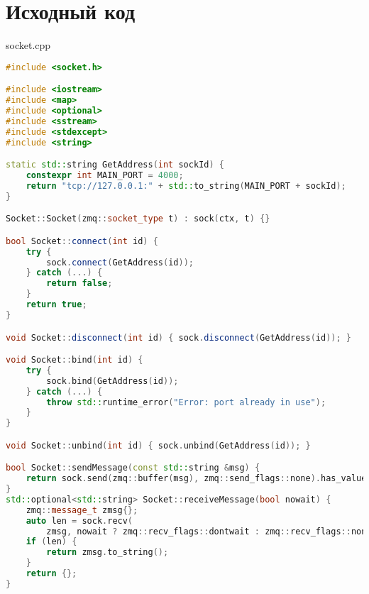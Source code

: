 \documentclass[a4paper, 12pt]{article}
\begin{document}
\newpage

\section{Исходный код}
socket.cpp
\begin{lstlisting}[language=C++]
#include <socket.h>

#include <iostream>
#include <map>
#include <optional>
#include <sstream>
#include <stdexcept>
#include <string>

static std::string GetAddress(int sockId) {
    constexpr int MAIN_PORT = 4000;
    return "tcp://127.0.0.1:" + std::to_string(MAIN_PORT + sockId);
}

Socket::Socket(zmq::socket_type t) : sock(ctx, t) {}

bool Socket::connect(int id) {
    try {
        sock.connect(GetAddress(id));
    } catch (...) {
        return false;
    }
    return true;
}

void Socket::disconnect(int id) { sock.disconnect(GetAddress(id)); }

void Socket::bind(int id) {
    try {
        sock.bind(GetAddress(id));
    } catch (...) {
        throw std::runtime_error("Error: port already in use");
    }
}

void Socket::unbind(int id) { sock.unbind(GetAddress(id)); }

bool Socket::sendMessage(const std::string &msg) {
    return sock.send(zmq::buffer(msg), zmq::send_flags::none).has_value();
}
std::optional<std::string> Socket::receiveMessage(bool nowait) {
    zmq::message_t zmsg{};
    auto len = sock.recv(
        zmsg, nowait ? zmq::recv_flags::dontwait : zmq::recv_flags::none);
    if (len) {
        return zmsg.to_string();
    }
    return {};
}
\end{lstlisting}
\end{document}
